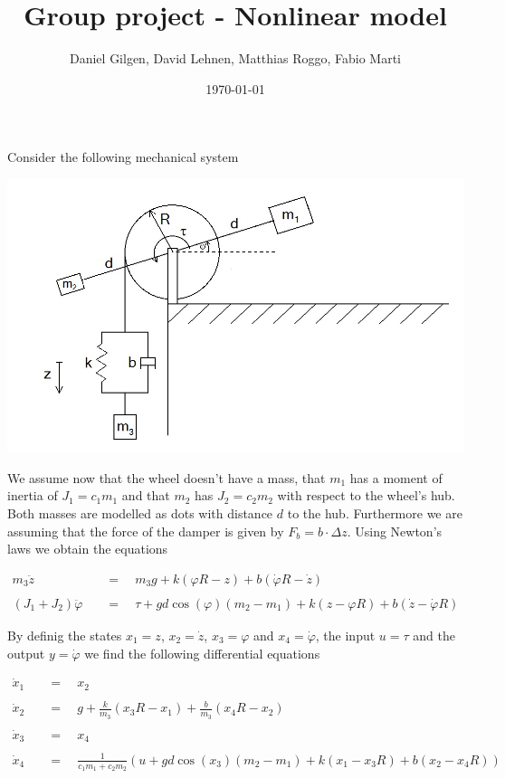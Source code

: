 \documentclass{article}
\title{Group project - Nonlinear model}
\author{Daniel Gilgen, David Lehnen, Matthias Roggo, Fabio Marti}
\date{\today}
\begin{document}
\maketitle
\parindent 0pt
\linespread{1.2} \selectfont
{}
\parskip 10pt

Consider the following mechanical system

\begin{center}
\includegraphics[width=14cm]{mechanical_system}
\end{center}


We assume now that the wheel doesn't have a mass, that \(m_1\) has a moment of inertia of \(J_1 = c_1 m_1\) and that \(m_2\) has \(J_2 = c_2 m_2\) with respect to the wheel's hub. Both masses are modelled as dots with distance \(d\) to the hub. Furthermore we are assuming that the force of the damper is given by \(F_b = b \cdot \Delta z\). Using Newton's laws we obtain the equations

\[
\begin{aligned}
m_3 \ddot{z}\quad &=\quad m_3 g + k (\varphi R - z) + b (\dot{\varphi}R - \dot{z}) \\\\
(J_1 + J_2)\ddot{\varphi}\quad &=\quad \tau + gd\cos(\varphi)(m_2 - m_1) + k(z - \varphi R) + b(\dot{z} - \dot{\varphi}R)
\end{aligned}
\]

By definig the states \(x_1 = z\), \(x_2 = \dot{z}\), \(x_3 = \varphi\) and \(x_4 = \dot{\varphi}\), the input \(u = \tau\) and the output \(y = \dot{\varphi}\) we find the following differential equations

\[
\begin{aligned}
\dot{x}_1\quad &=\quad x_2\\\\
\dot{x}_2\quad &=\quad g + \frac{k}{m_3} (x_3 R - x_1) + \frac{b}{m_3} (x_4 R - x_2)\\\\
\dot{x}_3\quad &=\quad x_4\\\\
\dot{x}_4\quad &=\quad \frac{1}{c_1 m_1 + c_2 m_2} \left( u + gd\cos(x_3)(m_2 - m_1) + k(x_1 - x_3 R) + b(x_2 - x_4R) \right)
\end{aligned}
\]
\end{document}
